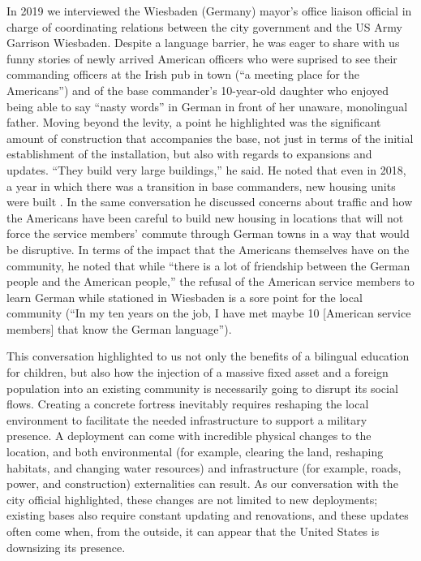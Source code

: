 {	In 2019 we interviewed the Wiesbaden (Germany) mayor's office liaison official in charge of coordinating relations between the city government and the US Army Garrison Wiesbaden. Despite a language barrier, he was eager to share with us funny stories of newly arrived American officers who were suprised to see their commanding officers at the Irish pub in town (``a meeting place for the Americans'') and of the base commander's 10-year-old daughter who enjoyed being able to say ``nasty words'' in German in front of her unaware, monolingual father. Moving beyond the levity, a point he highlighted was the significant amount of construction that accompanies the base, not just in terms of the initial establishment of the installation, but also with regards to expansions and updates. ``They build very large buildings,'' he said. He noted that even in 2018, a year in which there was a transition in base commanders, new housing units were built \cite{wiesbadenone20190725}. In the same conversation he discussed concerns about traffic and how the Americans have been careful to build new housing in locations that will not force the service members' commute through German towns in a way that would be disruptive. In terms of the impact that the Americans themselves have on the community, he noted that while ``there is a lot of friendship between the German people and the American people,'' the refusal of the American service members to learn German while stationed in Wiesbaden is a sore point for the local community (``In my ten years on the job, I have met maybe 10 [American service members] that know the German language'').

	
This conversation highlighted to us not only the benefits of a bilingual education for children, but also how the injection of a massive fixed asset and a foreign population into an existing community is necessarily going to disrupt its social flows. Creating a concrete fortress inevitably requires reshaping the local environment to facilitate the needed infrastructure to support a military presence. A deployment can come with incredible physical changes to the location, and both environmental (for example, clearing the land, reshaping habitats, and changing water resources) and infrastructure (for example, roads, power, and construction) externalities can result. As our conversation with the city official highlighted, these changes are not limited to new deployments; existing bases also require constant updating and renovations, and these updates often come when, from the outside, it can appear that the United States is downsizing its presence. 


}
